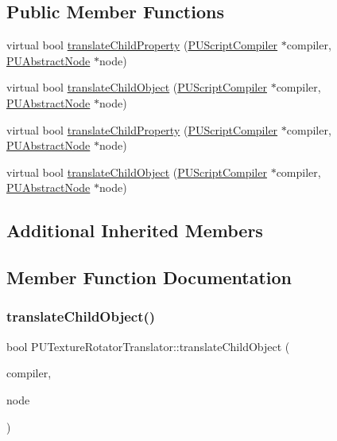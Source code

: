\subsection*{Public Member Functions}
\begin{DoxyCompactItemize}
\item 
virtual bool \hyperlink{classPUTextureRotatorTranslator_ab71568514f72f7cf6121222b52887dcd}{translate\+Child\+Property} (\hyperlink{classPUScriptCompiler}{P\+U\+Script\+Compiler} $\ast$compiler, \hyperlink{classPUAbstractNode}{P\+U\+Abstract\+Node} $\ast$node)
\item 
virtual bool \hyperlink{classPUTextureRotatorTranslator_ab782fcee1fe06a860822ca0a1375df09}{translate\+Child\+Object} (\hyperlink{classPUScriptCompiler}{P\+U\+Script\+Compiler} $\ast$compiler, \hyperlink{classPUAbstractNode}{P\+U\+Abstract\+Node} $\ast$node)
\item 
virtual bool \hyperlink{classPUTextureRotatorTranslator_a08dc728727c7ecff7c8b1f8fd07795da}{translate\+Child\+Property} (\hyperlink{classPUScriptCompiler}{P\+U\+Script\+Compiler} $\ast$compiler, \hyperlink{classPUAbstractNode}{P\+U\+Abstract\+Node} $\ast$node)
\item 
virtual bool \hyperlink{classPUTextureRotatorTranslator_a04704b854bb48d3e30519c0bbe425783}{translate\+Child\+Object} (\hyperlink{classPUScriptCompiler}{P\+U\+Script\+Compiler} $\ast$compiler, \hyperlink{classPUAbstractNode}{P\+U\+Abstract\+Node} $\ast$node)
\end{DoxyCompactItemize}
\subsection*{Additional Inherited Members}


\subsection{Member Function Documentation}
\mbox{\label{classPUTextureRotatorTranslator_ab782fcee1fe06a860822ca0a1375df09}} 
\subsubsection{\texorpdfstring{translate\+Child\+Object()}{translateChildObject()}\hspace{0.1cm}{\footnotesize\ttfamily [1/2]}}
{\footnotesize\ttfamily bool P\+U\+Texture\+Rotator\+Translator\+::translate\+Child\+Object (\begin{DoxyParamCaption}\item[{\hyperlink{classPUScriptCompiler}{P\+U\+Script\+Compiler} $\ast$}]{compiler,  }\item[{\hyperlink{classPUAbstractNode}{P\+U\+Abstract\+Node} $\ast$}]{node }\end{DoxyParamCaption})\hspace{0.3cm}{\ttfamily [virtual]}}

